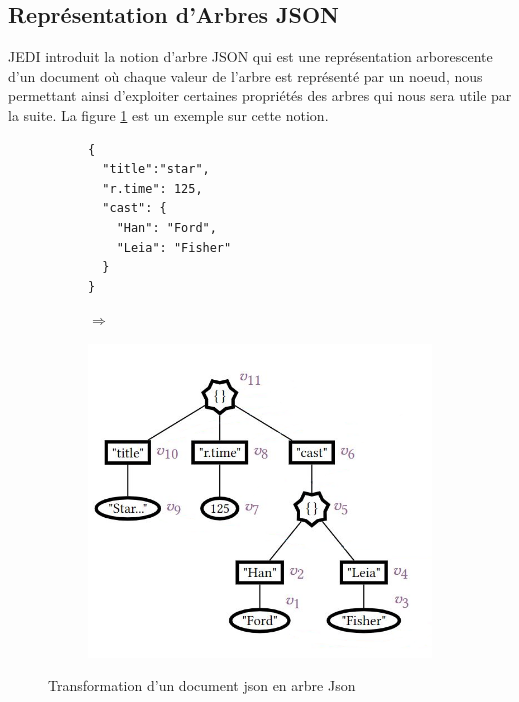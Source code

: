         \subsection{Représentation d'Arbres JSON}   
            JEDI introduit la notion d'arbre JSON qui est une représentation arborescente d'un document où chaque valeur de l'arbre est représenté par un noeud, nous permettant ainsi d'exploiter 
            certaines propriétés des arbres qui nous sera utile par la suite. La figure \ref{fig:transformation_json_en_arbre} est un exemple sur cette notion.
            \begin{figure}[H]
                \begin{subfigure}[H]{0.45\linewidth}
                    \begin{verbatim}
{
  "title":"star",
  "r.time": 125,
  "cast": {
    "Han": "Ford",
    "Leia": "Fisher"
  }
}
                    \end{verbatim}
                \end{subfigure}
                \begin{subfigure}[H]{0.05\linewidth}
                    $\Longrightarrow$
                \end{subfigure}
                \begin{subfigure}[H]{0.45\linewidth}
                    \begin{center}
                        \includegraphics[scale=0.5]{Photos/tree_representation.png}
                    \end{center} 
                \end{subfigure}
                \caption {Transformation d'un document json en arbre Json}
                \label{fig:transformation_json_en_arbre}
            \end{figure}

